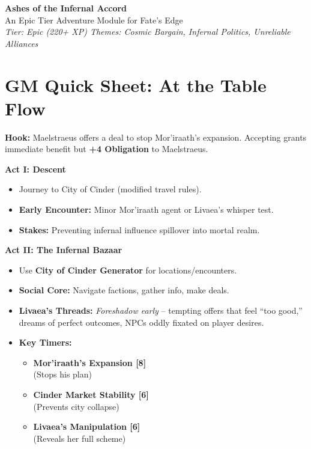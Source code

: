\documentclass[11pt,letterpaper]{article}
\newcommand{\timerbox}[2]{\noindent\textbf{#1 [#2]}\\}
\begin{document}


\begin{center}
    {\LARGE \textbf{Ashes of the Infernal Accord}}\\[0.5em]
    {\large An Epic Tier Adventure Module for Fate's Edge}\\[1em]
    {\itshape Tier: Epic (220+ XP) \quad Themes: Cosmic Bargain, Infernal Politics, Unreliable Alliances}
\end{center}

\section*{GM Quick Sheet: At the Table Flow}

\textbf{Hook:} Maelstraeus offers a deal to stop Mor'iraath's expansion. Accepting grants immediate benefit but \textbf{+4 Obligation} to Maelstraeus.

\textbf{Act I: Descent}
\begin{itemize}[leftmargin=*]
    \item Journey to City of Cinder (modified travel rules).
    \item \textbf{Early Encounter:} Minor Mor'iraath agent or Livaea's whisper test.
    \item \textbf{Stakes:} Preventing infernal influence spillover into mortal realm.
\end{itemize}

\textbf{Act II: The Infernal Bazaar}
\begin{itemize}[leftmargin=*]
    \item Use \textbf{City of Cinder Generator} for locations/encounters.
    \item \textbf{Social Core:} Navigate factions, gather info, make deals.
    \item \textbf{Livaea's Threads:} \textit{Foreshadow early} -- tempting offers that feel ``too good,'' dreams of perfect outcomes, NPCs oddly fixated on player desires.
    \item \textbf{Key Timers:}
    \begin{itemize}
        \item \timerbox{Mor'iraath's Expansion}{8} (Stops his plan)
        \item \timerbox{Cinder Market Stability}{6} (Prevents city collapse)
        \item \timerbox{Livaea's Manipulation}{6} (Reveals her full scheme)
    \end{itemize}
\end{itemize}
\end{document}
